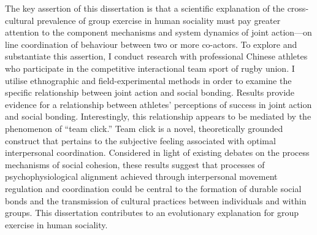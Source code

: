 The key assertion of this dissertation is that a scientific explanation of the cross-cultural prevalence of group exercise in human sociality must pay greater attention to the component mechanisms and system dynamics of joint action---on line coordination of behaviour between two or more co-actors. To explore and substantiate this assertion, I conduct research with professional Chinese athletes who participate in the competitive interactional team sport of rugby union.  I utilise ethnographic and field-experimental methods in order to examine the specific relationship between joint action and social bonding.  Results provide evidence for a relationship between athletes' perceptions of success in joint action and social bonding.  Interestingly, this relationship appears to be mediated by the phenomenon of ``team click.''  Team click is a novel, theoretically grounded construct that pertains to the subjective feeling associated with optimal interpersonal coordination.  Considered in light of existing debates on the process mechanisms of social cohesion, these results suggest that processes of psychophysiological alignment achieved through interpersonal movement regulation and coordination could be central to the formation of durable social bonds and the transmission of cultural practices between individuals and within groups.  This dissertation contributes to an evolutionary explanation for group exercise in human sociality.
